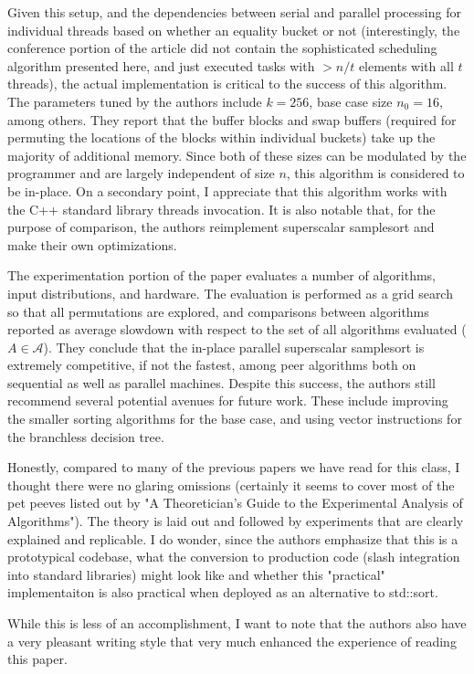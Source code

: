 Given this setup, and the dependencies between serial and parallel processing for individual threads based on whether an equality bucket or not (interestingly, the conference portion of the article did not contain the sophisticated scheduling algorithm presented here, and just executed tasks with $> n/t$ elements with all $t$ threads), the actual implementation is critical to the success of this algorithm. The parameters tuned by the authors include $k = 256$, base case size $n_0 = 16$, among others. They report that the buffer blocks and swap buffers (required for permuting the locations of the blocks within individual buckets) take up the majority of additional memory. Since both of these sizes can be modulated by the programmer and are largely independent of size $n$, this algorithm is considered to be in-place. On a secondary point, I appreciate that this algorithm works with the C++ standard library threads invocation. It is also notable that, for the purpose of comparison, the authors reimplement superscalar samplesort and make their own optimizations.

The experimentation portion of the paper evaluates a number of algorithms, input distributions, and hardware. The evaluation is performed as a grid search so that all permutations are explored, and comparisons between algorithms reported as average slowdown with respect to the set of all algorithms evaluated ($A \in \mathcal{A}$). They conclude that the in-place parallel superscalar samplesort is extremely competitive, if not the fastest, among peer algorithms both on sequential as well as parallel machines. Despite this success, the authors still recommend several potential avenues for future work. These include improving the smaller sorting algorithms for the base case, and using vector instructions for the branchless decision tree. 

Honestly, compared to many of the previous papers we have read for this class, I thought there were no glaring omissions (certainly it seems to cover most of the pet peeves listed out by "A Theoretician's Guide to the Experimental Analysis of Algorithms"). The theory is laid out and followed by experiments that are clearly explained and replicable. I do wonder, since the authors emphasize that this is a prototypical codebase, what the conversion to production code (slash integration into standard libraries) might look like and whether this "practical" implementaiton is also practical when deployed as an alternative to std::sort.

While this is less of an accomplishment, I want to note that the authors also have a very pleasant writing style that very much enhanced the experience of reading this paper.
